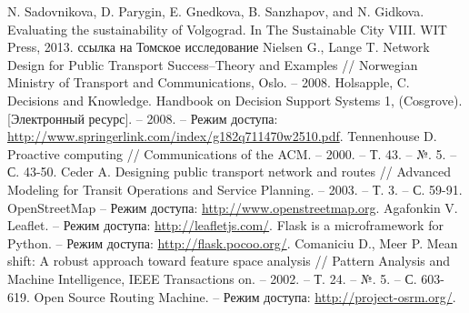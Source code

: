 \renewcommand{\bibname}{Список использованных источников}

\begin{thebibliography}{10}
     N. Sadovnikova, D. Parygin, E. Gnedkova, B. Sanzhapov, and N. Gidkova. 
        Evaluating the sustainability of Volgograd. In The Sustainable City VIII. WIT Press, 2013.
     ссылка на Томское исследование
     Nielsen G., Lange T. Network Design for Public Transport Success–Theory and Examples //
        Norwegian Ministry of Transport and Communications, Oslo. -- 2008.
     Holsapple, C. Decisions and Knowledge. Handbook on Decision Support Systems 1, 
        (Cosgrove). [Электронный ресурс]. -- 2008. -- Режим доступа: 
        \url{http://www.springerlink.com/index/g182q711470w2510.pdf}.
     Tennenhouse D. Proactive computing //
        Communications of the ACM. -- 2000. -- Т. 43. -- №. 5. -- С. 43-50.
     Ceder A. Designing public transport network and routes //
        Advanced Modeling for Transit Operations and Service Planning. -- 2003. -- Т. 3. -- С. 59-91.
     OpenStreetMap -- Режим доступа: \url{http://www.openstreetmap.org}.
     Agafonkin V. Leaflet. -- Режим доступа: \url{http://leafletjs.com/}.
     Flask is a microframework for Python. -- 
        Режим доступа: \url{http://flask.pocoo.org/}.
     Comaniciu D., Meer P. Mean shift: A robust approach toward feature space analysis //
        Pattern Analysis and Machine Intelligence, IEEE Transactions on. -- 2002. -- Т. 24. -- №. 5. -- 
        С. 603-619.
     Open Source Routing Machine. -- Режим доступа: \url{http://project-osrm.org/}.

\end{thebibliography}
